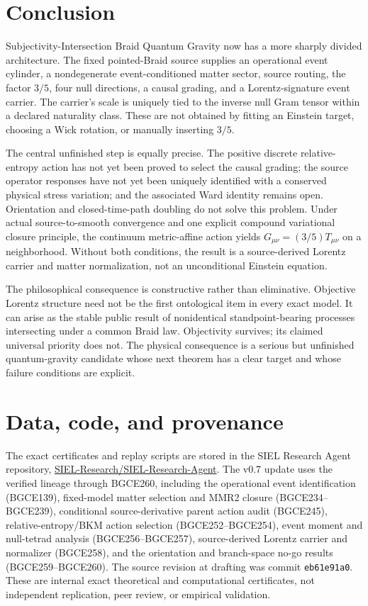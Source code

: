 \documentclass[11pt]{article}
\theoremstyle{definition}
\theoremstyle{remark}
\begin{document}
\section{Conclusion}

Subjectivity-Intersection Braid Quantum Gravity now has a more sharply divided architecture. The fixed pointed-Braid source supplies an operational event cylinder, a nondegenerate event-conditioned matter sector, source routing, the factor $3/5$, four null directions, a causal grading, and a Lorentz-signature event carrier. The carrier's scale is uniquely tied to the inverse null Gram tensor within a declared naturality class. These are not obtained by fitting an Einstein target, choosing a Wick rotation, or manually inserting $3/5$.

The central unfinished step is equally precise. The positive discrete relative-entropy action has not yet been proved to select the causal grading; the source operator responses have not yet been uniquely identified with a conserved physical stress variation; and the associated Ward identity remains open. Orientation and closed-time-path doubling do not solve this problem. Under actual source-to-smooth convergence and one explicit compound variational closure principle, the continuum metric-affine action yields $G_{\mu\nu}=(3/5)T_{\mu\nu}$ on a neighborhood. Without both conditions, the result is a source-derived Lorentz carrier and matter normalization, not an unconditional Einstein equation.

The philosophical consequence is constructive rather than eliminative. Objective Lorentz structure need not be the first ontological item in every exact model. It can arise as the stable public result of nonidentical standpoint-bearing processes intersecting under a common Braid law. Objectivity survives; its claimed universal priority does not. The physical consequence is a serious but unfinished quantum-gravity candidate whose next theorem has a clear target and whose failure conditions are explicit.

\section*{Data, code, and provenance}

The exact certificates and replay scripts are stored in the SIEL Research Agent repository,
\href{https://github.com/SIEL-Research/SIEL-Research-Agent}{SIEL-Research/SIEL-Research-Agent}. The v0.7 update uses the verified lineage through BGCE260, including the operational event identification (BGCE139), fixed-model matter selection and MMR2 closure (BGCE234--BGCE239), conditional source-derivative parent action audit (BGCE245), relative-entropy/BKM action selection (BGCE252--BGCE254), event moment and null-tetrad analysis (BGCE256--BGCE257), source-derived Lorentz carrier and normalizer (BGCE258), and the orientation and branch-space no-go results (BGCE259--BGCE260). The source revision at drafting was commit \texttt{eb61e91a0}. These are internal exact theoretical and computational certificates, not independent replication, peer review, or empirical validation.
\end{document}
